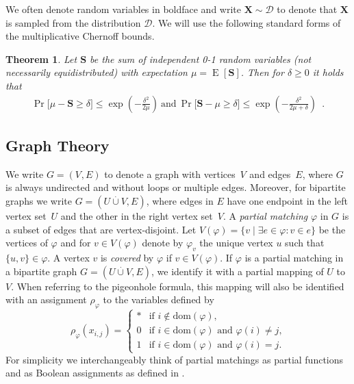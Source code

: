 \documentclass{article}
\newtheorem{theorem}{Theorem}\newtheorem{lemma}[theorem]{Lemma}\newtheorem{proposition}[theorem]{Proposition}\newtheorem{corollary}[theorem]{Corollary}\newtheorem{definition}[theorem]{Definition}\newtheorem{claim}[theorem]{Claim}\newtheorem{remark}[theorem]{Remark}
\DeclareMathOperator{\Expop}{E}
\newcommand{\Prob}[2][]{\Pr_{#1} \bigl[ #2 \bigr]}
\newcommand{\expectation}[2][]{\Expop_{#1} [ #2 ]}
\newcommand{\domainof}[1]{\ensuremath{\mathrm{dom} ( #1 )}}
\newcommand{\set}[1]{\{ #1 \}}
\newcommand{\setdescr}[3][\mid]{\set{ #2 #1 #3 }}
\newcommand{\disjointunion}{\overset{.}{\cup}}
\newcommand{\introduceterm}[1]{{\emph{#1}}}
\newcommand{\eqperiod}{\enspace .}
\newcommand{\V}[1][]{V_{#1}}
\newcommand{\matchbool}[1]{\rho_{#1}}
\newcommand{\matchboolof}[2]{\rho_{#1}(#2)}
\newcommand{\matcha}{\varphi}
\newcommand{\matchaof}[1]{\matcha(#1)}
\newcommand{\Xrand}{\boldsymbol{X}}
\newcommand{\sample}[2]{#1\sim#2}
\numberwithin{equation}{section}
\begin{document}
We often denote random variables in boldface and write
$\sample{\Xrand}{\mathcal{D}}$ to denote that $\Xrand$ is sampled from
the distribution $\mathcal{D}$. We will use the following standard
forms of the multiplicative Chernoff bounds.
\begin{theorem}
  \label{thm:Chernoff}
  Let 
  $\boldsymbol{S}$ 
  be the sum of independent 0-1 random variables 
  (not necessarily equidistributed)
  with expectation $\mu = \expectation{\boldsymbol{S}}$.
  Then for $\delta \geq 0$ it holds that
  \begin{align*}
    \Prob{
    \mu - \boldsymbol{S} \geq \delta
    }
    \leq
      \exp
      \left(
      - \frac{\delta^2}{2\mu}
      \right)~\text{and}~
    \Prob{
    \boldsymbol{S} - \mu \geq \delta
    }
    \leq 
      \exp
      \left(
      - \frac{\delta^2}{2\mu + \delta}
      \right)\eqperiod
  \end{align*}
\end{theorem}

\subsection{Graph Theory}

We write  $G=(\V,E)$ to denote a graph with vertices~$\V$ and
edges~$E$, where $G$ is always undirected and without loops or
multiple edges.
Moreover, 
for bipartite graphs we write
$G = (U \disjointunion V, E)$, where edges in $E$ have one endpoint in
the left vertex set~$U$ and the other in the right vertex set~$V$. 
A \introduceterm{partial matching} $\matcha$ in $G$ is a subset of edges that 
are vertex-disjoint.
Let $V(\matcha) = \setdescr{v}{\exists e \in \matcha: v \in e}$ be the
vertices of $\matcha$ and for $v\in V(\matcha)$ denote by 
$\matcha_v$ the unique vertex $u$
such that $\set{u,v} \in \matcha$. A vertex $v$ 
is \introduceterm{covered} by $\matcha$ if $v \in V(\matcha)$.
If $\matcha$ is a partial matching in a bipartite graph 
$G = (U \disjointunion V, E)$, 
we identify it with a partial mapping of
$U$ to~$V$.
When referring to the pigeonhole formula,
this mapping will also be identified with an assignment
$\matchbool{\matcha}$ to the  
variables defined by
\begin{equation}
  \label{eq:matching-to-assignment}
  \matchboolof{\matcha}{x_{i,j}}
  =
  \begin{cases}
    * 
    & \text{if $i \notin \domainof{\matcha}$,} 
    \\
    0 
    & \text{if $i \in \domainof{\matcha}$ and $\matchaof{i} \neq j$,} 
    \\
    1 
    & \text{if $i \in \domainof{\matcha}$ and $\matchaof{i} = j$.} 
  \end{cases}
\end{equation}
For simplicity we interchangeably think of partial matchings as
partial functions and as Boolean assignments as defined in
.
\end{document}
